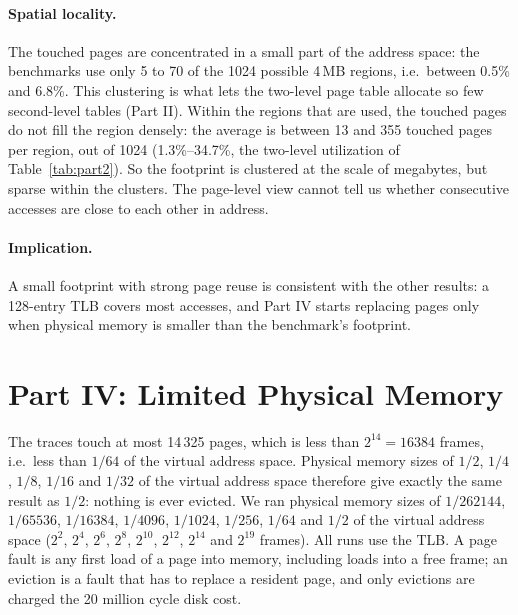 \documentclass[11pt,a4paper]{article}
\begin{document}
\paragraph{Spatial locality.} The touched pages are concentrated in a small part of the address space: the benchmarks use only 5 to 70 of the 1024 possible 4\,MB regions, i.e.\ between 0.5\% and 6.8\%. This clustering is what lets the two-level page table allocate so few second-level tables (Part II). Within the regions that are used, the touched pages do not fill the region densely: the average is between 13 and 355 touched pages per region, out of 1024 (1.3\%--34.7\%, the two-level utilization of Table~\ref{tab:part2}). So the footprint is clustered at the scale of megabytes, but sparse within the clusters. The page-level view cannot tell us whether consecutive accesses are close to each other in address.

\paragraph{Implication.} A small footprint with strong page reuse is consistent with the other results: a 128-entry TLB covers most accesses, and Part IV starts replacing pages only when physical memory is smaller than the benchmark's footprint.

\section{Part IV: Limited Physical Memory}

The traces touch at most 14\,325 pages, which is less than $2^{14}=16384$ frames, i.e.\ less than $1/64$ of the virtual address space. Physical memory sizes of $1/2$, $1/4$, $1/8$, $1/16$ and $1/32$ of the virtual address space therefore give exactly the same result as $1/2$: nothing is ever evicted. We ran physical memory sizes of $1/262144$, $1/65536$, $1/16384$, $1/4096$, $1/1024$, $1/256$, $1/64$ and $1/2$ of the virtual address space ($2^{2}$, $2^{4}$, $2^{6}$, $2^{8}$, $2^{10}$, $2^{12}$, $2^{14}$ and $2^{19}$ frames). All runs use the TLB. A page fault is any first load of a page into memory, including loads into a free frame; an eviction is a fault that has to replace a resident page, and only evictions are charged the 20 million cycle disk cost.
\end{document}
